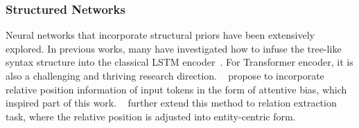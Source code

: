 \documentclass[letterpaper]{article} \usepackage{aaai21}  \usepackage{times}  \usepackage{helvet} \usepackage{courier}  \usepackage[hyphens]{url}  \usepackage{graphicx} \usepackage{booktabs}
\begin{document}
\subsubsection{Structured Networks}
Neural networks that incorporate structural priors have been extensively explored.
In previous works, many have investigated how to infuse the tree-like syntax structure into the classical LSTM encoder~\cite{DBLP:conf/iclr/KimDHR17,shen2018ordered,peng2017cross}.
For Transformer encoder, it is also a challenging and thriving research direction.
~\citet{shaw-etal-2018-self} propose to incorporate relative position information of input tokens in the form of attentive bias, which inspired part of this work.
~\citet{wang-etal-2019-extracting} further extend this method to relation extraction task, where the relative position is adjusted into entity-centric form.

\begin{table*}[t!]
\centering
\bgroup
\def\arraystretch{1.2}
\egroup
\caption{Summary of DocRED, CDR and GDA datasets. For column \textit{Mention / Sent}, we exclude sentences that do not contain any entity mention. }
\label{datasets}
\end{table*}

\begin{table*}[!]
\centering
\bgroup
\def\arraystretch{1.2}
\egroup
\caption{Hyper-parameters Setting.}
\label{hyper-parameters}
\end{table*}
\end{document}
